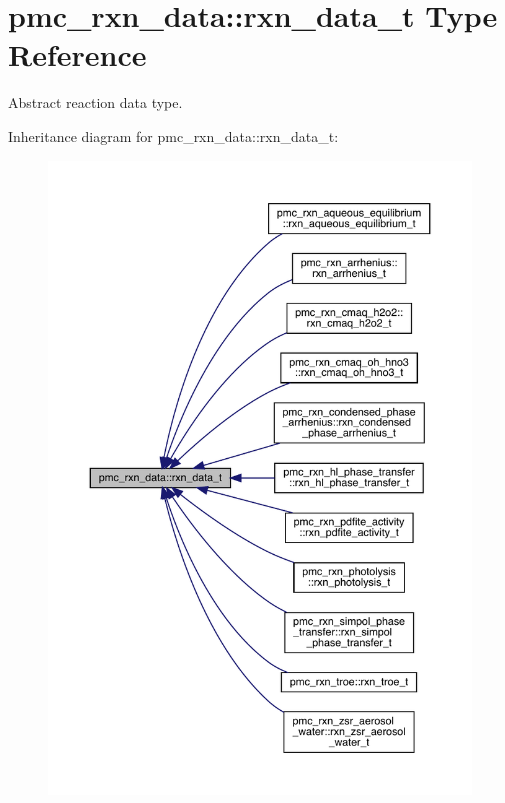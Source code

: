 \hypertarget{structpmc__rxn__data_1_1rxn__data__t}{}\section{pmc\+\_\+rxn\+\_\+data\+:\+:rxn\+\_\+data\+\_\+t Type Reference}
\label{structpmc__rxn__data_1_1rxn__data__t}


Abstract reaction data type.  




Inheritance diagram for pmc\+\_\+rxn\+\_\+data\+:\+:rxn\+\_\+data\+\_\+t\+:\nopagebreak
\begin{figure}[H]
\begin{center}
\leavevmode
\includegraphics[width=350pt]{structpmc__rxn__data_1_1rxn__data__t__inherit__graph}
\end{center}
\end{figure}
